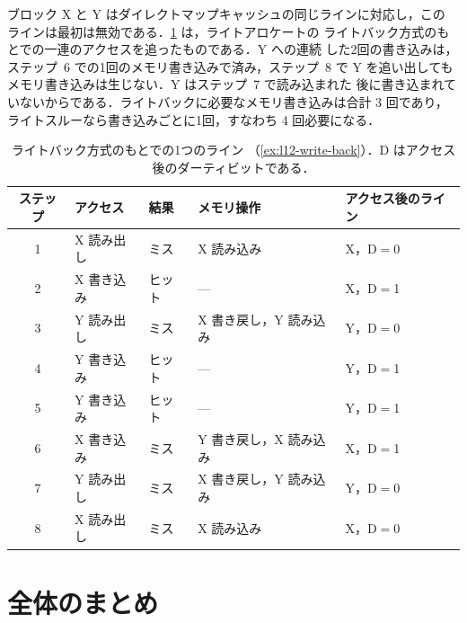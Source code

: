 \documentclass[../main.tex]{subfiles}
\begin{document}
\begin{example}
  \label{ex:l12-write-back}
  ブロック X と Y はダイレクトマップキャッシュの同じラインに対応し，この
  ラインは最初は無効である．\cref{tab:l12-write-back} は，ライトアロケートの
  ライトバック方式のもとでの一連のアクセスを追ったものである．Y への連続
  した2回の書き込みは，ステップ~6 での1回のメモリ書き込みで済み，ステップ~8
  で Y を追い出してもメモリ書き込みは生じない．Y はステップ~7 で読み込まれた
  後に書き込まれていないからである．ライトバックに必要なメモリ書き込みは合計 3 回であり，
  ライトスルーなら書き込みごとに1回，すなわち 4 回必要になる．
\end{example}

\begin{table}[htbp]
  \centering\small
  \caption{ライトバック方式のもとでの1つのライン
    （\cref{ex:l12-write-back}）．D はアクセス後のダーティビットである．}
  \label{tab:l12-write-back}
  \begin{tabular}{@{}cllll@{}}
    \toprule
    ステップ & アクセス  & 結果 & メモリ操作        & アクセス後のライン \\
    \midrule
    1    & X 読み出し & ミス   & X 読み込み                & X，D$=$0 \\
    2    & X 書き込み & ヒット & ---                       & X，D$=$1 \\
    3    & Y 読み出し & ミス   & X 書き戻し，Y 読み込み    & Y，D$=$0 \\
    4    & Y 書き込み & ヒット & ---                       & Y，D$=$1 \\
    5    & Y 書き込み & ヒット & ---                       & Y，D$=$1 \\
    6    & X 書き込み & ミス   & Y 書き戻し，X 読み込み    & X，D$=$1 \\
    7    & Y 読み出し & ミス   & X 書き戻し，Y 読み込み    & Y，D$=$0 \\
    8    & X 読み出し & ミス   & X 読み込み                & X，D$=$0 \\
    \bottomrule
  \end{tabular}
\end{table}

\section{全体のまとめ}
\label{sec:l12-summary}
\end{document}
